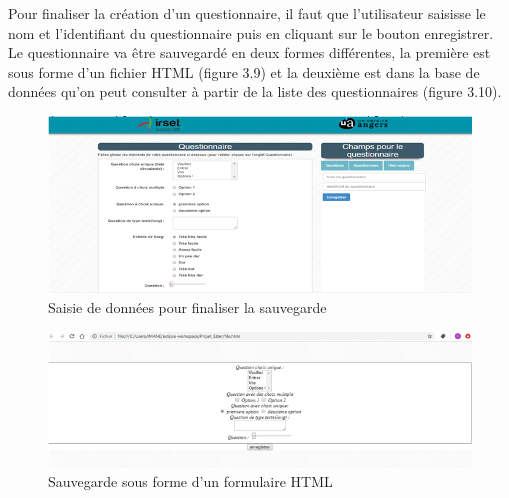 Pour finaliser la création d’un questionnaire, il faut que l’utilisateur saisisse le nom et l’identifiant du questionnaire puis en cliquant sur le bouton enregistrer. Le questionnaire va être sauvegardé en deux formes différentes, la première est sous forme d’un fichier HTML (figure 3.9) et la deuxième est dans la base de données qu’on peut consulter à partir de la liste des questionnaires (figure 3.10).


\begin{figure}[H]
    \begin{center}
	\includegraphics[scale=0.7]{img/questionnaire/enregistrement}
    \end{center}
    \caption{Saisie de données pour finaliser la sauvegarde}
\end{figure}


\begin{figure}[H]
    \begin{center}
	\includegraphics[scale=0.7]{img/questionnaire/fichier}
    \end{center}
    \caption{Sauvegarde sous forme d'un formulaire HTML}
\end{figure}

